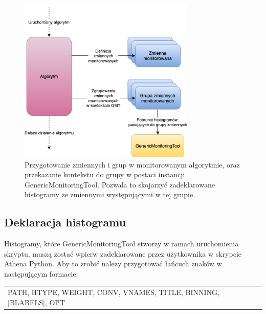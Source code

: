 \begin{figure}[!ht]
\centering
\includegraphics[width=0.75\textwidth]{img/algo_run.png}
\caption{
Przygotowanie zmiennych i grup w monitorowanym algorytmie, oraz przekazanie kontekstu do grupy w postaci instancji GenericMonitoringTool. Pozwala to skojarzyć zadeklarowane histogramy ze zmiennymi występującymi w tej grupie. 
}
\label{fig:athena:oldFlow}
\end{figure}

\subsection{Deklaracja histogramu}
Histogramy, które GenericMonitoringTool stworzy w ramach uruchomienia skryptu, muszą zostać wpierw zadeklarowane przez użytkownika w skrypcie Athena Python. Aby to zrobić należy przygotować łańcuch znaków w następującym formacie: 

\begin{center}
\begin{tabular}{l}
PATH, HTYPE, WEIGHT, CONV, VNAMES, TITLE, BINNING, [BLABELS], OPT
\end{tabular}
\end{center}

